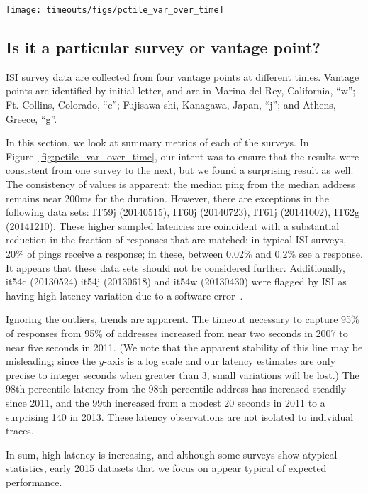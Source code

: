 \begin{figure*}
  \begin{center}
  \texttt{[image: timeouts/figs/pctile\_var\_over\_time]}
  \end{center}
  \caption{\label{fig:pctile_var_over_time}Top: Minimum timeout
    required to capture the $c^{th}$ percentile latency
    sample from the $c^{th}$ percentile address in each
    survey, organized by time.  Each point represents the
    timeout required to capture, e.g., 95\% of the responses
    from 95\% of the addresses.  The 1\% line is indicative
    of the minimum.  Bottom: Response rate for each survey;
    symbols represent which vantage point was used.  Surveys
    from Japan with very few successes are not plotted on
    the top graph.}
\end{figure*}


\subsection{Is it a particular survey or vantage point?}

ISI survey data are collected from four vantage points at
different times.  Vantage points are identified by initial
letter, and are in Marina del Rey,
California, ``w''; Ft. Collins, Colorado, ``c''; Fujisawa-shi, Kanagawa,
Japan, ``j''; and Athens, Greece, ``g''.  

In this section, we look at summary metrics of each of the
surveys.  In Figure~\ref{fig:pctile_var_over_time}, our
intent was to ensure that the results were consistent from
one survey to the next, but we found a surprising result as
well.  The consistency of values is apparent: the median
ping from the median address remains near 200ms for the
duration.  However, there are exceptions in the following
data sets: IT59j (20140515), IT60j (20140723), IT61j
(20141002), IT62g (20141210). 
These
higher sampled latencies are coincident with a substantial
reduction in the fraction of responses that are matched: in
typical ISI surveys, 20\% of pings receive a response; in
these, between 0.02\% and 0.2\% see a response.  It appears
that these data sets should not be considered further.
Additionally, it54c (20130524) it54j (20130618) and it54w (20130430)
were flagged by ISI as having high latency variation due to 
a software error~\cite{isi-notes-54}.

Ignoring the outliers, trends are apparent.  The timeout
necessary to capture 95\% of responses from 95\% of
addresses increased from near two seconds in 2007 to near
five seconds in 2011.  (We note that the apparent stability
of this line may be misleading; since the $y$-axis is a log
scale and our latency estimates are only precise to integer
seconds when greater than 3, small variations will be lost.)
The 98th percentile latency from the 98th percentile address
has increased steadily since 2011, and the 99th increased
from a modest 20 seconds in 2011 to a surprising 140 in
2013.  These latency observations are not isolated to
individual traces.

In sum, high latency is increasing, and although some surveys
show atypical statistics, early 2015 datasets that we focus on
appear typical of expected performance.






